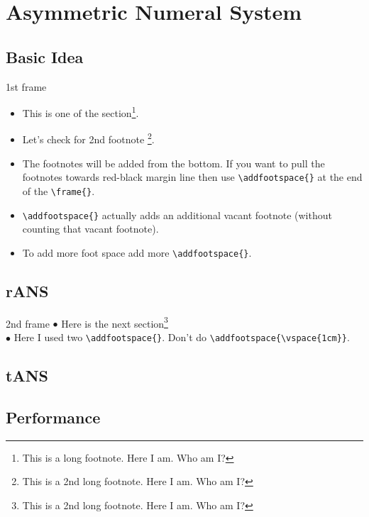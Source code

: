 \section{Asymmetric Numeral System}
\subsection{Basic Idea}
\begin{frame}[fragile]{1st frame}
    \begin{itemize}
        \item This is one of the section\footnote{This is a long footnote. Here I am. Who am I?}. 
        \item Let's check for 2nd footnote \footnote{This is a 2nd long footnote. Here I am. Who am I?}.
        \item The footnotes will be added from the bottom. If you want to pull the footnotes towards red-black margin line then use \verb|\addfootspace{}| at the end of the \verb|\frame{}|.
        \item \verb|\addfootspace{}| actually adds an additional vacant footnote (without counting that vacant footnote).
        \item To add more foot space add more \verb|\addfootspace{}|. 
    \end{itemize}
\addfootspace{} %
\end{frame}
\subsection{rANS}
\begin{frame}[fragile]{2nd frame}
    $\bullet$ Here is the next section\footnote{This is a 2nd long footnote. Here I am. Who am I?}\\
    $\bullet$ Here I used two \verb|\addfootspace{}|. Don't do \verb|\addfootspace{\vspace{1cm}}|.
    \addfootspace{}\addfootspace{}
\end{frame}
\subsection{tANS}
\subsection{Performance}
